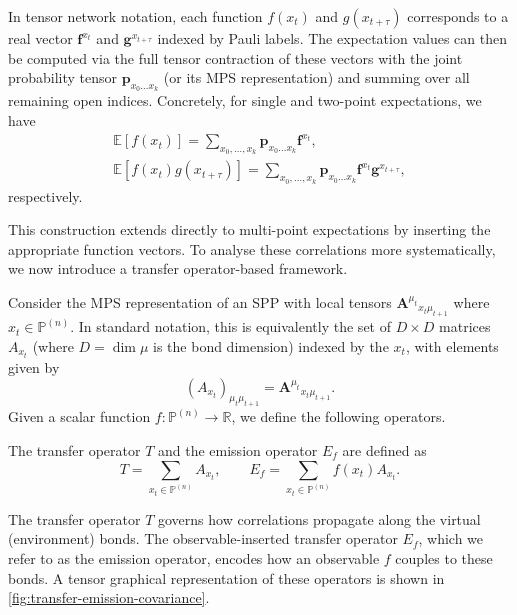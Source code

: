 In tensor network notation, each function \(f(x_t)\) and \(g(x_{t+\tau})\) corresponds to a real vector \(\mathbf{f}^{x_t}\) and \(\mathbf{g}^{x_{t+\tau}}\) indexed by Pauli labels. The expectation values can then be computed via the full tensor contraction of these vectors with the joint probability tensor \(\mathbf{p}_{x_0\dots x_k}\) (or its MPS representation) and summing over all remaining open indices. Concretely, for single and two-point expectations, we have
\begin{equation}
    \begin{gathered}
        \mathbb{E}[f(x_t)]
        = \sum_{x_0,\dots,x_k} \mathbf{p}_{x_0\dots x_k} 
        \mathbf{f}^{x_t}, \\
        \mathbb{E}[f(x_t) g(x_{t+\tau})] 
        = \sum_{x_0,\dots,x_k} \mathbf{p}_{x_0\dots x_k} 
        \mathbf{f}^{x_t} \mathbf{g}^{x_{t+\tau}},
    \end{gathered}
\end{equation}
respectively.

This construction extends directly to multi-point expectations by inserting the appropriate function vectors. To analyse these correlations more systematically, we now introduce a transfer operator-based framework.

Consider the MPS representation of an SPP with local tensors \(\mathbf{A}^{\mu_t}{}_{x_t\mu_{t+1}}\) where \(x_t \in \mathbb{P}^{(n)}\). In standard notation, this is equivalently the set of \(D \times D\) matrices \(A_{x_t}\) (where \(D = \dim{\mu}\) is the bond dimension) indexed by the \(x_t\), with elements given by
\begin{equation}
    (A_{x_t})_{\mu_t \mu_{t+1}} = \mathbf{A}^{\mu_t}{}_{x_t \mu_{t+1}}.
\end{equation}
Given a scalar function \(f : \mathbb{P}^{(n)} \to \mathbb{R}\), we define the following operators.
\begin{definition}
    The transfer operator \(T\) and the emission operator \(E_f\) are defined as 
\begin{equation}
    T = \sum_{x_t\in\mathbb{P}^{(n)}}A_{x_t},
    \qquad
    E_f = \sum_{x_t\in\mathbb{P}^{(n)}} f(x_t) A_{x_t}.
\end{equation}
\end{definition}
The transfer operator \(T\) governs how correlations propagate along the virtual (environment) bonds. The observable-inserted transfer operator \(E_f\), which we refer to as the emission operator, encodes how an observable \(f\) couples to these bonds. A tensor graphical representation of these operators is shown in \cref{fig:transfer-emission-covariance}.

